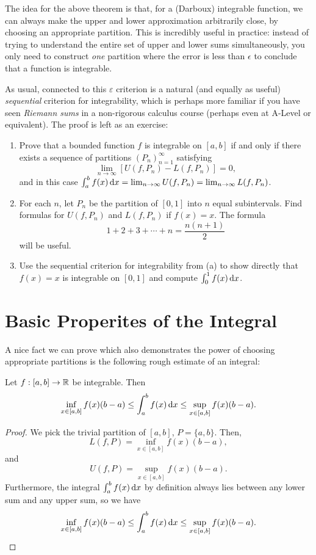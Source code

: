 \documentclass[../analysis1.tex]{subfiles}
\begin{document}
\begin{remark}
    The idea for the above theorem is that, for a (Darboux) integrable function, we can always make the upper and lower approximation arbitrarily close, by choosing an appropriate partition. This is incredibly useful in practice: instead of trying to understand the entire set of upper and lower sums simultaneously, you only need to construct \textit{one} partition where the error is less than $\epsilon$ to conclude that a function is integrable.
\end{remark}

As usual, connected to this $\varepsilon$ criterion is a natural (and equally as useful) \textit{sequential} criterion for integrability, which is perhaps more familiar if you have seen \textit{Riemann sums} in a non-rigorous calculus course (perhaps even at A-Level or equivalent). The proof is left as an exercise:

\begin{exercise*}
\begin{enumerate}
    \item[(a)] Prove that a bounded function $f$ is integrable on $[a,b]$ if and only if there exists a sequence of partitions $(P_n)_{n=1}^\infty$ satisfying
    \[
    \lim_{n\to\infty} [U(f, P_n) - L(f, P_n)] = 0,
    \]
    and in this case $\int_a^b f(x) \d{x} = \lim_{n\to\infty} U(f, P_n) = \lim_{n\to\infty} L(f, P_n)$.
    \item[(b)] For each $n$, let $P_n$ be the partition of $[0,1]$ into $n$ equal subintervals. Find formulas for $U(f, P_n)$ and $L(f, P_n)$ if $f(x) = x$. The formula \[1 + 2 + 3 + \cdots + n = \frac{n(n + 1)}{2}\] will be useful.
    \item[(c)] Use the sequential criterion for integrability from (a) to show directly that $f(x) = x$ is integrable on $[0,1]$ and compute $\int_0^1 f(x) \d{x}$.
\end{enumerate}
\end{exercise*}


\section{Basic Properites of the Integral}
A nice fact we can prove which also demonstrates the power of choosing appropriate partitions is the following rough estimate of an integral:
\begin{lemma}
\label{lem:integralestimate}
    \begin{shaded*}
        Let $f:[a,b]\to\mathbb{R}$ be integrable. Then
        \[
            \inf_{x\in[a,b]}f(x)(b-a) \le \int_a^b f(x) \d{x} \le \sup_{x\in[a,b]}f(x)(b-a).
        \]
    \end{shaded*}
\end{lemma}
\begin{proof}
    We pick the trivial partition of $[a,b]$, $P=\{a,b\}$. Then, \[L(f,P)=\inf_{x\in[a,b]}f(x)(b-a),\] and \[U(f,P)=\sup_{x\in[a,b]}f(x)(b-a).\] Furthermore, the integral $\int_a^b f(x) \d{x}$ by definition always lies between any lower sum and any upper sum, so we have
    \[\inf_{x\in[a,b]}f(x)(b-a)\le \int_a^b f(x) \d{x}\le \sup_{x\in [a,b]}f(x)(b-a).\]
\end{proof}
\end{document}
